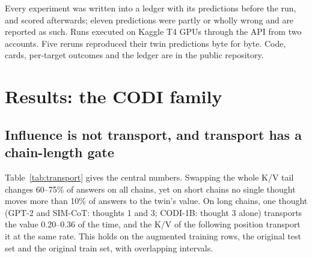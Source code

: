 \documentclass{article}
\begin{document}
Every experiment was written into a ledger with its predictions before the run, and scored afterwards; eleven predictions were partly or wholly wrong and are reported as such. Runs executed on Kaggle T4 GPUs through the API from two accounts. Five reruns reproduced their twin predictions byte for byte. Code, cards, per-target outcomes and the ledger are in the public repository.

\section{Results: the CODI family}

\subsection{Influence is not transport, and transport has a chain-length gate}\label{sec:transport}

Table~\ref{tab:transport} gives the central numbers. Swapping the whole K/V tail changes 60--75\% of answers on all chains, yet on short chains no single thought moves more than 10\% of answers to the twin's value. On long chains, one thought (GPT-2 and SIM-CoT: thoughts 1 and 3; CODI-1B: thought 3 alone) transports the value 0.20--0.36 of the time, and the K/V of the following position transport it at the same rate. This holds on the augmented training rows, the original test set and the original train set, with overlapping intervals.
\end{document}
